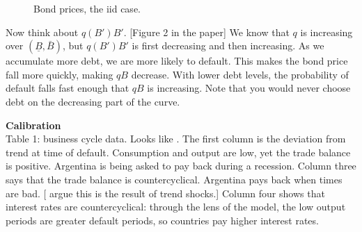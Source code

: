 \documentclass[11pt, pdftex]{article}
\begin{document}
\begin{figure}[ht]
\caption{Bond prices, the iid case.}
\label{fig:qb}
\centering
{}
\end{figure}


Now think about $q(B')B'$. [Figure 2 in the paper]  We know that $q$ is increasing over $(\underline{B},\bar{B})$, but $q(B')B'$ is first decreasing and then increasing.  As we accumulate more debt, we are more likely to default.  This makes the bond price fall more quickly, making $qB$ decrease.  With lower debt levels, the probability of default falls fast enough that $qB$ is increasing.  Note that you would never choose debt on the decreasing part of the curve.


\textbf{Calibration}\\
Table 1: business cycle data.  Looks like \citet{NP05}. The first column is the deviation from trend at time of default. Consumption and output are low, yet the trade balance is positive. Argentina is being asked to pay back during a recession. Column three says that the trade balance is countercyclical. Argentina pays back when times are bad. [\citet{AG07} argue this is the result of trend shocks.] Column four shows that interest rates  are countercyclical: through the lens of the model, the low output periods are greater default periods, so countries pay higher interest rates.
\end{document}
